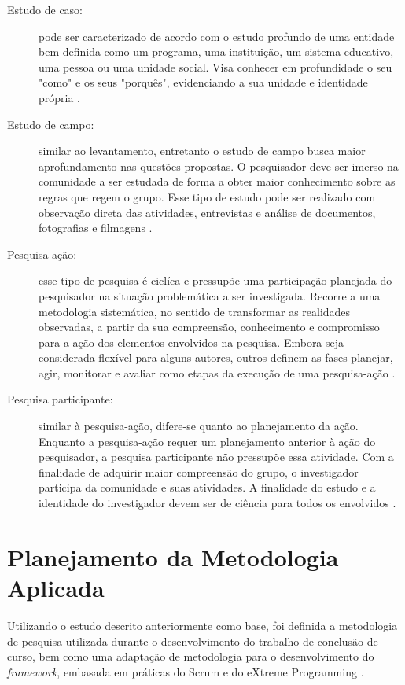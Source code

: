 \begin{description}
\item[Estudo de caso:] pode ser caracterizado de acordo com o estudo profundo de uma entidade bem definida como um programa, uma instituição, um sistema educativo, uma pessoa ou uma unidade social. Visa conhecer em profundidade o seu "como" e os seus "porquês", evidenciando a sua unidade e identidade própria \cite{prodanov2013}. 

\item[Estudo de campo:] similar ao levantamento, entretanto o estudo de campo busca maior aprofundamento nas questões propostas. O pesquisador deve ser imerso na comunidade a ser estudada de forma a obter maior conhecimento sobre as regras que regem o grupo. Esse tipo de estudo pode ser realizado com observação direta das atividades, entrevistas e análise de documentos, fotografias e filmagens \cite{tafner2007}.

\item[Pesquisa-ação:] esse tipo de pesquisa é ciclíca e pressupõe uma participação planejada do pesquisador na situação problemática a ser investigada. Recorre a uma metodologia sistemática, no sentido de transformar as realidades observadas, a partir da sua compreensão, conhecimento e compromisso para a ação dos elementos envolvidos na pesquisa\cite{thiollent2009}. Embora seja considerada flexível para alguns autores, outros definem as fases planejar, agir, monitorar e avaliar como etapas da execução de uma pesquisa-ação \cite{ferreira2011}. 

\item[Pesquisa participante:] similar à pesquisa-ação, difere-se quanto ao planejamento da ação. Enquanto a pesquisa-ação requer um planejamento anterior à ação do pesquisador, a pesquisa participante não pressupõe essa atividade. Com a finalidade de adquirir maior compreensão do grupo, o investigador participa da comunidade e suas atividades. A finalidade do estudo e a identidade do investigador devem ser de ciência para todos os envolvidos \cite{tafner2007}.
\end{description}

 \section{Planejamento da Metodologia Aplicada}
  
Utilizando o estudo descrito anteriormente como base, foi definida a metodologia de pesquisa utilizada durante o desenvolvimento do trabalho de conclusão de curso, bem como uma adaptação de metodologia para o desenvolvimento do \textit{framework}, embasada em práticas do Scrum \cite{scrum2014} e do eXtreme Programming \cite{wells2009}.  
  
